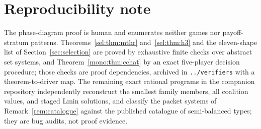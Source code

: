 \documentclass[11pt]{article}
\begin{document}
\section*{Reproducibility note}

The phase-diagram proof is human and enumerates neither games nor
payoff-stratum patterns.  Theorems~\ref{sel:thm:mthr}
and~\ref{sel:thm:h3} and the eleven-shape list of
Section~\ref{sec:selection} are proved by exhaustive finite checks over
abstract set systems, and Theorem~\ref{mono:thm:cchat} by an exact
five-player decision procedure; those checks are proof dependencies,
archived in \texttt{../verifiers} with a theorem-to-driver map.  The remaining exact
rational programs in the companion repository independently reconstruct the
smallest family members, all coalition values, and staged Lmin solutions,
and classify the packet systems of Remark~\ref{rem:catalogue} against the
published catalogue of semi-balanced types; they are bug audits, not proof
evidence.
\end{document}
